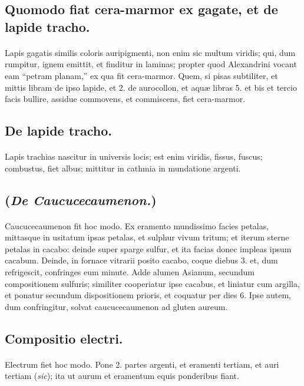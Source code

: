 \documentclass[a4paper, 11pt, oneside, polutonikogreek, italian]{article}
\begin{document}
\subsection{Quomodo fiat cera-marmor ex gagate, et de lapide tracho.}
\paragraph{}
Lapis gagatis similis coloris auripigmenti, non enim sic multum viridis; qui, dum rumpitur, ignem emittit, et finditur in laminas; propter quod Alexandrini vocant eam ``petram planam,'' ex qua fit cera-marmor. Quem, si pisas subtiliter, et mittis libram de ipso lapide, et 2. de aurocollon, et aquæ libras 5. et bis et tercio facis bullire, assidue commovens, et commiscens, fiet cera-marmor.

\subsection{De lapide tracho.}
\paragraph{}
Lapis trachias nascitur in universis locis; est enim viridis, fissus, fuscus; combustus, fiet albus; mittitur in cathmia in mundatione argenti.

\subsection{(\emph{De Caucucecaumenon.})}
\paragraph{}
Caucucecaumenon fit hoc modo. Ex eramento mundissimo facies petalas, mittasque in usitatum ipsas petalas, et sulphur vivum tritum; et iterum sterne petalas in cacabo: deinde super sparge sulfur, et ita facias donec impleas ipsum cacabum. Deinde, in fornace vitrarii posito cacabo, coque diebus 3. et, dum refrigescit, confringes eum minute. Adde alumen Asianum, secundum compositionem sulfuris; similiter cooperiatur ipse cacabus, et liniatur cum argilla, et ponatur secundum dispositionem prioris, et coquatur per dies 6. Ipse autem, dum confringitur, solvat caucucecaumenon ad gluten aureum.

\subsection{Compositio electri.}
\paragraph{}
Electrum fiet hoc modo. Pone 2. partes argenti, et eramenti tertiam, et auri tertiam (\emph{sic}); ita ut aurum et eramentum equis ponderibus fiant.
\end{document}
